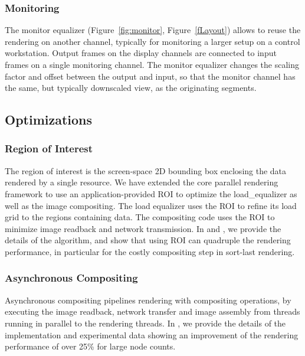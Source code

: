 \documentclass[10pt,journal,compsoc]{IEEEtran}
\newcommand{\fig}[1]{Figure~\ref{#1}}
\begin{document}
\subsubsection{Monitoring}

The monitor equalizer (\fig{fig:monitor}, \fig{fLayout}) allows to reuse the
rendering on another channel, typically for monitoring a larger setup on a
control workstation. Output frames on the display channels are connected to
input frames on a single monitoring channel. The monitor equalizer changes the
scaling factor and offset between the output and input, so that the monitor
channel has the same, but typically downscaled view, as the originating
segments.

\subsection{Optimizations}

\subsubsection{Region of Interest}

The region of interest is the screen-space 2D bounding box enclosing the data
rendered by a single resource. We have extended the core parallel rendering
framework to use an application-provided ROI to optimize the
\textsf{load\_equalizer} as well as the image compositing. The load equalizer
uses the ROI to refine its load grid to the regions containing data. The
compositing code uses the ROI to minimize image readback and network
transmission. In \cite{MEP:10} and \cite{EBAHMP:12}, we provide the details of
the algorithm, and show that using ROI can quadruple the rendering performance,
in particular for the costly compositing step in sort-last rendering.

\subsubsection{Asynchronous Compositing}

Asynchronous compositing pipelines rendering with compositing operations, by
executing the image readback, network transfer and image assembly from threads
running in parallel to the rendering threads. In \cite{EBAHMP:12}, we provide
the details of the implementation and experimental data showing an improvement
of the rendering performance of over 25\% for large node counts.
\end{document}
